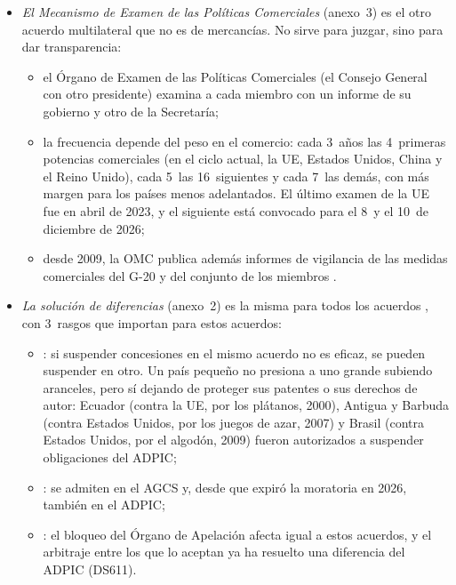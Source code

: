 \documentclass[11pt]{article}
\begin{document}
\begin{itemize}
\item \emph{El Mecanismo de Examen de las Políticas Comerciales} (anexo~3) es el otro acuerdo multilateral que no es de mercancías. No sirve para juzgar, sino para dar transparencia:
  \begin{itemize}
  \item el Órgano de Examen de las Políticas Comerciales (el Consejo General con otro presidente) examina a cada miembro con un informe de su gobierno y otro de la Secretaría;
  \item la frecuencia depende del peso en el comercio: cada 3~años las 4~primeras potencias comerciales (en el ciclo actual, la UE, Estados Unidos, China y el Reino Unido), cada 5~las 16~siguientes y cada 7~las demás, con más margen para los países menos adelantados. El último examen de la UE fue en abril de 2023, y el siguiente está convocado para el 8~y el 10~de diciembre de 2026\nocite{OMC2026MEPC};
  \item desde 2009, la OMC publica además informes de vigilancia de las medidas comerciales del G-20 y del conjunto de los miembros .
  \end{itemize}
\item \emph{La solución de diferencias} (anexo~2) es la misma para todos los acuerdos , con 3~rasgos que importan para estos acuerdos:
  \begin{itemize}
  \item {}: si suspender concesiones en el mismo acuerdo no es eficaz, se pueden suspender en otro. Un país pequeño no presiona a uno grande subiendo aranceles, pero sí dejando de proteger sus patentes o sus derechos de autor: Ecuador (contra la UE, por los plátanos, 2000), Antigua y Barbuda (contra Estados Unidos, por los juegos de azar, 2007) y Brasil (contra Estados Unidos, por el algodón, 2009) fueron autorizados a suspender obligaciones del ADPIC;
  \item {}: se admiten en el AGCS y, desde que expiró la moratoria en 2026, también en el ADPIC;
  \item {}: el bloqueo del Órgano de Apelación afecta igual a estos acuerdos, y el arbitraje entre los que lo aceptan ya ha resuelto una diferencia del ADPIC (DS611).
  \end{itemize}
\end{itemize}

\end{document}
